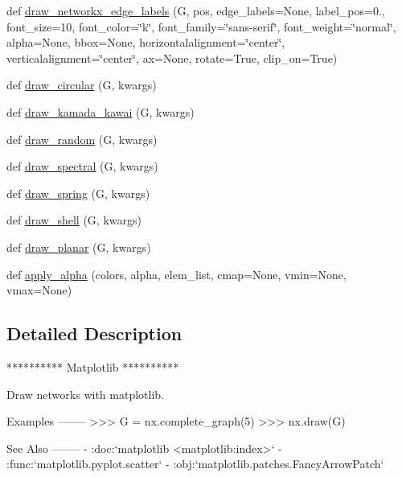 \begin{DoxyCompactItemize}
$$\item 
def \hyperlink{namespacenetworkx_1_1drawing_1_1nx__pylab_ac71727a8ce6993138e6b4e9b2b38ec6c}{draw\+\_\+networkx\+\_\+edge\+\_\+labels} (G, pos, edge\+\_\+labels=None, label\+\_\+pos=0., font\+\_\+size=10, font\+\_\+color=\char`\"{}k\char`\"{}, font\+\_\+family=\char`\"{}sans-\/serif\char`\"{}, font\+\_\+weight=\char`\"{}normal\char`\"{}, alpha=None, bbox=None, horizontalalignment=\char`\"{}center\char`\"{}, verticalalignment=\char`\"{}center\char`\"{}, ax=None, rotate=True, clip\+\_\+on=True)
\item 
def \hyperlink{namespacenetworkx_1_1drawing_1_1nx__pylab_ab89d6773b43206bca9bcee0d05e5e2e8}{draw\+\_\+circular} (G, kwargs)
\item 
def \hyperlink{namespacenetworkx_1_1drawing_1_1nx__pylab_a62710432baf9e173eff963c9ee9cbf14}{draw\+\_\+kamada\+\_\+kawai} (G, kwargs)
\item 
def \hyperlink{namespacenetworkx_1_1drawing_1_1nx__pylab_ae8ec30406a42f7c3296ffca2260dce69}{draw\+\_\+random} (G, kwargs)
\item 
def \hyperlink{namespacenetworkx_1_1drawing_1_1nx__pylab_a2641bdfab26d56a434e2ccd8f403bfaa}{draw\+\_\+spectral} (G, kwargs)
\item 
def \hyperlink{namespacenetworkx_1_1drawing_1_1nx__pylab_aac1c6c6cb4283783cd8d9b97c62e3b2d}{draw\+\_\+spring} (G, kwargs)
\item 
def \hyperlink{namespacenetworkx_1_1drawing_1_1nx__pylab_ae93adbb59f973371b6639edbdb997253}{draw\+\_\+shell} (G, kwargs)
\item 
def \hyperlink{namespacenetworkx_1_1drawing_1_1nx__pylab_a1a77ee04f7a8a5b04de461332027abd7}{draw\+\_\+planar} (G, kwargs)
\item 
def \hyperlink{namespacenetworkx_1_1drawing_1_1nx__pylab_a09fc3bf9141b36d33e22fff1cd99e283}{apply\+\_\+alpha} (colors, alpha, elem\+\_\+list, cmap=None, vmin=None, vmax=None)
\end{DoxyCompactItemize}


\subsection{Detailed Description}
\begin{DoxyVerb}**********
Matplotlib
**********

Draw networks with matplotlib.

Examples
--------
>>> G = nx.complete_graph(5)
>>> nx.draw(G)

See Also
--------
 - :doc:`matplotlib <matplotlib:index>`
 - :func:`matplotlib.pyplot.scatter`
 - :obj:`matplotlib.patches.FancyArrowPatch`
\end{DoxyVerb}
 

